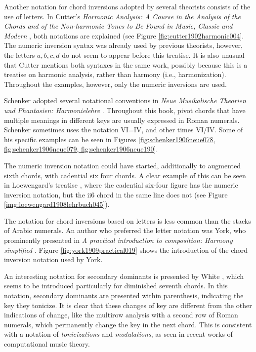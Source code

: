 Another notation for chord inversions adopted by several theorists consists of the use of letters.
In Cutter's \emph{Harmonic Analysis: A Course in the Analysis of the Chords and of the Non-harmonic Tones to Be Found in Music, Classic and Modern} \cite{cutter1902harmonic}, both notations are explained (see Figure \ref{fig:cutter1902harmonic004}.
The numeric inversion syntax was already used by previous theorists, however, the letters ${a, b, c , d}$ do not seem to appear before this treatise.
It is also unusual that Cutter mentions both syntaxes in the same work, possibly because this is a treatise on harmonic analysis, rather than harmony (i.e., harmonization).
Throughout the examples, however, only the numeric inversions are used.

Schenker adopted several notational conventions in \emph{Neue Musikalische Theorien und Phantasien: Harmonielehre} \cite{schenker1906neue}.
Throughout this book, pivot chords that have multiple meanings in different keys are usually expressed in Roman numerals.
Schenker sometimes uses the notation VI=IV, and other times VI/IV.
Some of his specific examples can be seen in Figures \ref{fig:schenker1906neue078, fig:schenker1906neue079, fig:schenker1906neue190}.

The numeric inversion notation could have started, additionally to augmented sixth chords, with cadential six four chords.
A clear example of this can be seen in Loewengard's treatise \cite{loewengard1908lehrbuch}, where the cadential six-four figure has the numeric inversion notation, but the ii6 chord in the same line does not (see Figure \ref{img:loewengard1908lehrbuch045}).

The notation for chord inversions based on letters is less common than the stacks of Arabic numerals.
An author who preferred the letter notation was York, who prominently presented in \emph{A practical introduction to composition: Harmony simplified} \cite{york1909practical}.
Figure \ref{fig:york1909practical019} shows the introduction of the chord inversion notation used by York.

An interesting notation for secondary dominants is presented by White \cite{white1911harmonic}, which seems to be introduced particularly for diminished seventh chords.
In this notation, secondary dominants are presented within parenthesis, indicating the key they tonicize.
It is clear that these changes of key are different from the other indications of change, like the multirow analysis with a second row of Roman numerals, which permanently change the key in the next chord.
This is consistent with a notation of \emph{tonicizations} and \emph{modulations}, as seen in recent works of computational music theory.

